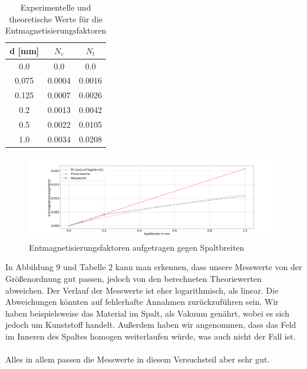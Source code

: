             \begin{table}[H]
                \centering
                \begin{tabular}[]{c|c|c}
                    d [mm] & $N_e$ & $N_t$\\
                    \hline
                    0.0     & 0.0       & 0.0   \\
                    0.075   & 0.0004    & 0.0016\\
                    0.125   & 0.0007    & 0.0026\\
                    0.2     & 0.0013    & 0.0042\\
                    0.5     & 0.0022    & 0.0105\\
                    1.0     & 0.0034    & 0.0208\\
                \end{tabular}
                \caption{Experimentelle und theoretische Werte für die Entmagnetisierungsfaktoren}
            \end{table}
            \begin{figure}[H]
                \centering
                \includegraphics[width=0.8 \textwidth]{Images/Teil4.2_Entmagnetisierungsfakoren.png}
                \caption{Entmagnetisierungsfaktoren aufgetragen gegen Spaltbreiten}
            \end{figure}
            In Abbildung 9 und Tabelle 2 kann man erkennen, dass unsere Messwerte von der Größenordnung gut passen, jedoch von den
            berechneten Theoriewerten abweichen. Der Verlauf der Messwerte ist eher logarithmisch, als linear.
            Die Abweichungen könnten auf fehlerhafte Annahmen zurückzuführen sein. Wir haben beispielsweise das Material im Spalt,
            als Vakuum genährt, wobei es sich jedoch um Kunststoff handelt. Außerdem haben wir angenommen, dass das Feld 
            im Inneren des Spaltes homogen weiterlaufen würde, was auch nicht der Fall ist.\\
            \\

            Alles in allem passen die Messwerte in diesem Versuchsteil aber sehr gut.